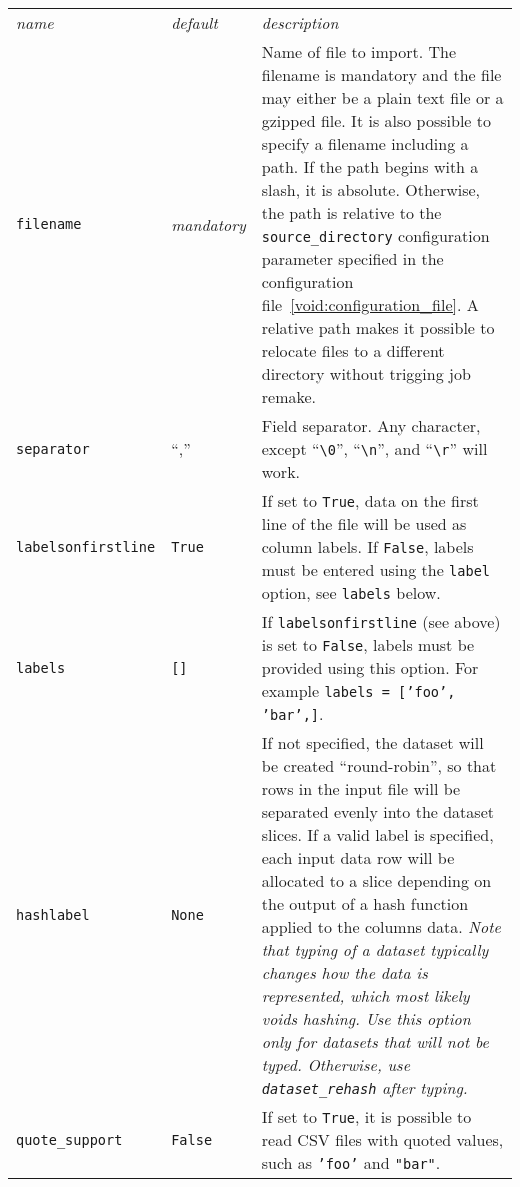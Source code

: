 \begin{tabular}{ p{3.2cm} p{1.8cm} p{10cm}}
  \textsl{name} & \textsl{default} & \textsl{description}\\[2ex]

  \texttt{filename} & \emph{mandatory} & Name of file to import.  The
  filename is mandatory and the file may either be a plain text file
  or a gzipped file.  It is also possible to specify a filename
  including a path.  If the path begins with a slash, it is absolute.
  Otherwise, the path is relative to the \texttt{source\_directory}
  configuration parameter specified in the configuration
  file~\ref{void:configuration_file}.  A relative path makes it
  possible to relocate files to a different directory without trigging
  job remake.\\[1ex]
  
  \texttt{separator} & ``,'' & Field separator.  Any character, except
  ``\verb$\0$'', ``\verb$\n$'', and ``\verb$\r$'' will work.\\[1ex]

  
  \texttt{labelsonfirstline} & \texttt{True} & If set to
  \texttt{True}, data on the first line of the file will be used as
  column labels.  If \texttt{False}, labels must be entered using the
  \texttt{label} option, see \texttt{labels} below.\\[1ex]

  \texttt{labels} & \texttt{[]} & If \texttt{labelsonfirstline} (see
  above) is set to \texttt{False}, labels must be provided using this
  option.  For example \texttt{labels = ['foo', 'bar',]}.\\[1ex]

  \texttt{hashlabel} & \texttt{None} & If not specified, the dataset
  will be created ``round-robin'', so that rows in the input file will
  be separated evenly into the dataset slices.  If a valid label is
  specified, each input data row will be allocated to a slice
  depending on the output of a hash function applied to the columns
  data.  \textsl{Note that typing of a dataset typically changes how
    the data is represented, which most likely voids hashing.  Use
    this option only for datasets that will not be typed.  Otherwise,
    use \texttt{dataset\_rehash} after typing.}\\[1ex]

  \texttt{quote\_support} & \texttt{False} & If set to \texttt{True},
  it is possible to read CSV files with quoted values, such as
  \texttt{'foo'} and \texttt{"bar"}.\\[1ex]


\end{tabular}
